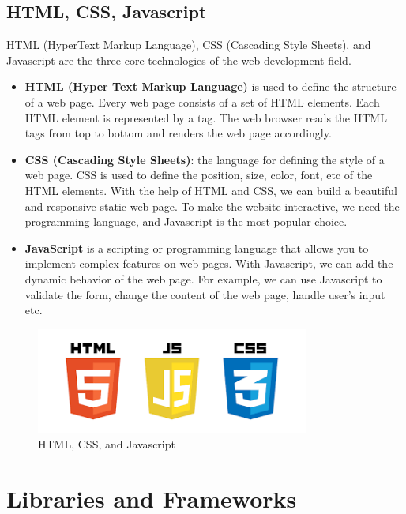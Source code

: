 \subsection{HTML, CSS, Javascript}
HTML (HyperText Markup Language), CSS (Cascading Style Sheets), and Javascript are the three core technologies of the web development field. 
\begin{itemize}

    \item \textbf{HTML (Hyper Text Markup Language)} is used to define the structure of a web page. Every web page consists of a set of HTML elements. Each HTML element is represented by a tag. The web browser reads the HTML tags from top to bottom and renders the web page accordingly.

    \item \textbf{CSS (Cascading Style Sheets)}: the language for defining the style of a web page. CSS is used to define the position, size, color, font, etc of the HTML elements. With the help of HTML and CSS, we can build a beautiful and responsive static web page. To make the website interactive, we need the programming language, and Javascript is the most popular choice.

    \item \textbf{JavaScript} is a scripting or programming language that allows you to implement complex features on web pages. With Javascript, we can add the dynamic behavior of the web page. For example, we can use Javascript to validate the form, change the content of the web page, handle user's input etc.
\end{itemize}

\begin{figure}[ht]
    \centering
    \includegraphics[width=0.8\textwidth]{Images/8.Technology_Stack/html_css_js.png}
    \caption{HTML, CSS, and Javascript}
    \label{fig:html_css_javascript}
\end{figure}

\section{Libraries and Frameworks}
